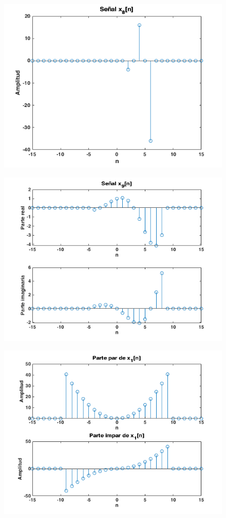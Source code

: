 \documentclass{article}
\begin{document}
\begin{figure} \caption[Figura 8]{}
	\centering
		\includegraphics[width=\linewidth]{./Figures/08.png}
\end{figure}

\begin{figure} \caption[Figura 9]{}
	\centering
		\includegraphics[width=\linewidth]{./Figures/09.png}
\end{figure}

\begin{figure} \caption[Figura 10]{}
	\centering
		\includegraphics[width=\linewidth]{./Figures/10.png}
\end{figure}
\end{document}
